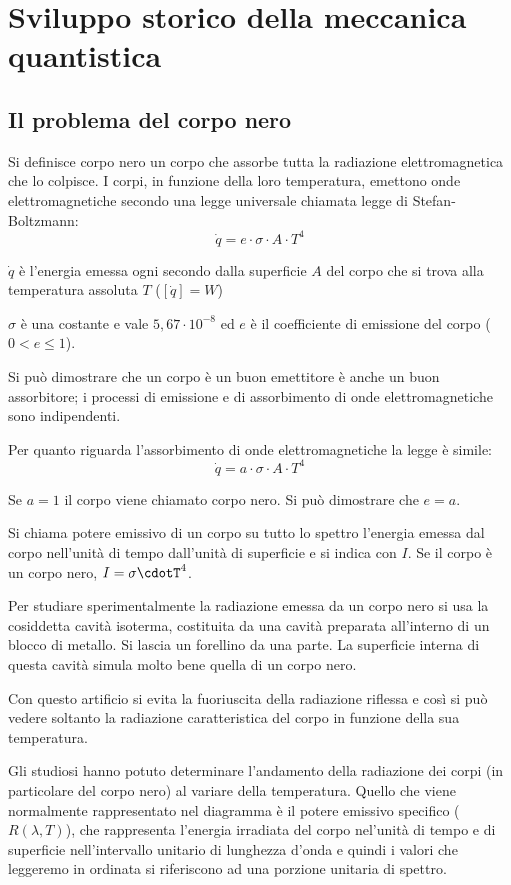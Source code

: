 \section{Sviluppo storico della meccanica quantistica}
    \subsection{Il problema del corpo nero}
        \par Si definisce corpo nero un corpo che assorbe tutta la radiazione elettromagnetica che lo colpisce. I corpi, in funzione della loro temperatura, emettono onde elettromagnetiche secondo una legge universale chiamata legge di Stefan-Boltzmann:
        \begin{equation}
            \dot{q} = e \cdot \sigma \cdot A \cdot T^4
        \end{equation}
        \par $\dot{q}$ è l'energia emessa ogni secondo dalla superficie $A$ del corpo che si trova alla temperatura assoluta $T$ ($[\dot{q}] = W$)
        \par $\sigma$ è una costante e vale $5,67\cdot10^{-8}$ ed $e$ è il coefficiente di emissione del corpo ($0<e\leq1$).
        \par Si può dimostrare che un corpo è un buon emettitore è anche un buon assorbitore; i processi di emissione e di assorbimento di onde elettromagnetiche sono indipendenti.
        \par Per quanto riguarda l'assorbimento di onde elettromagnetiche la legge è simile:
        \begin{equation}
            \dot{q}=a\cdot\sigma\cdot A\cdot T^4
        \end{equation}
        \par Se $a=1$ il corpo viene chiamato corpo nero. Si può dimostrare che $e=a$.
        \par Si chiama potere emissivo di un corpo su tutto lo spettro l'energia emessa dal corpo nell'unità di tempo dall'unità di superficie e si indica con $I$. Se il corpo è un corpo nero, $I=\sigma\cdotT^4$.
        \par Per studiare sperimentalmente la radiazione emessa da un corpo nero si usa la cosiddetta cavità isoterma, costituita da una cavità preparata all'interno di un blocco di metallo. Si lascia un forellino da una parte. La superficie interna di questa cavità simula molto bene quella di un corpo nero.
        \par Con questo artificio si evita la fuoriuscita della radiazione riflessa e così si può vedere soltanto la radiazione caratteristica del corpo in funzione della sua temperatura.
        \par Gli studiosi hanno potuto determinare l'andamento della radiazione dei corpi (in particolare del corpo nero) al variare della temperatura. Quello che viene normalmente rappresentato nel diagramma è il potere emissivo specifico ($R(\lambda,T)$), che rappresenta l'energia irradiata del corpo nel'unità di tempo e di superficie nell'intervallo unitario di lunghezza d'onda e quindi i valori che leggeremo in ordinata si riferiscono ad una porzione unitaria di spettro.
